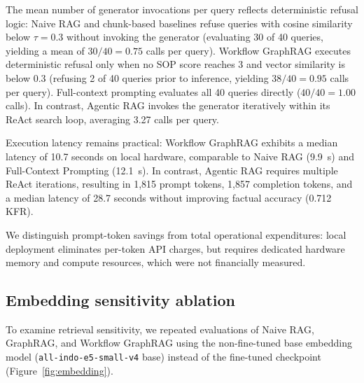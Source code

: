 \documentclass[preprint,10pt]{elsarticle}
\begin{document}
\begin{table}[!htbp]
\centering
\caption{Operational resource consumption per query across evaluated systems: mean prompt and completion tokens, mean generator invocations, and median execution latency across all 40 questions.}
\label{tab:cost}
\small
\setlength{\tabcolsep}{4pt}
\resizebox{\textwidth}{!}{%
}
\end{table}

The mean number of generator invocations per query reflects deterministic refusal logic: Naive RAG and chunk-based baselines refuse queries with cosine similarity below $\tau = 0.3$ without invoking the generator (evaluating 30 of 40 queries, yielding a mean of $30/40 = 0.75$ calls per query). Workflow GraphRAG executes deterministic refusal only when no SOP score reaches 3 and vector similarity is below 0.3 (refusing 2 of 40 queries prior to inference, yielding $38/40 = 0.95$ calls per query). Full-context prompting evaluates all 40 queries directly ($40/40 = 1.00$ calls). In contrast, Agentic RAG invokes the generator iteratively within its ReAct search loop, averaging 3.27 calls per query.

Execution latency remains practical: Workflow GraphRAG exhibits a median latency of 10.7 seconds on local hardware, comparable to Naive RAG (9.9~s) and Full-Context Prompting (12.1~s). In contrast, Agentic RAG requires multiple ReAct iterations, resulting in 1,815 prompt tokens, 1,857 completion tokens, and a median latency of 28.7 seconds without improving factual accuracy (0.712 KFR).

We distinguish prompt-token savings from total operational expenditures: local deployment eliminates per-token API charges, but requires dedicated hardware memory and compute resources, which were not financially measured.

\subsection{Embedding sensitivity ablation}
\label{sec:ablation-embedding}
To examine retrieval sensitivity, we repeated evaluations of Naive RAG, GraphRAG, and Workflow GraphRAG using the non-fine-tuned base embedding model (\texttt{all-indo-e5-small-v4} base) instead of the fine-tuned checkpoint (Figure~\ref{fig:embedding}).
\end{document}
